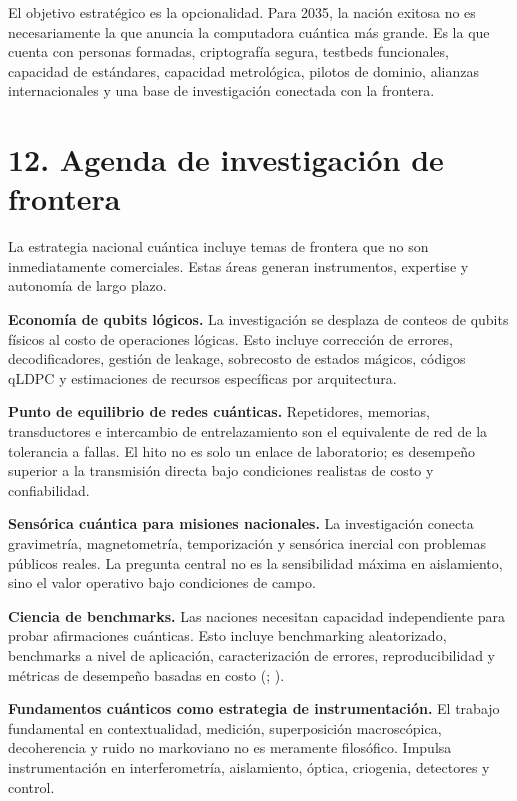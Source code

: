 \documentclass[
  11pt,
  letterpaper,
]{article}
\begin{document}
El objetivo estratégico es la opcionalidad. Para 2035, la nación exitosa
no es necesariamente la que anuncia la computadora cuántica más grande.
Es la que cuenta con personas formadas, criptografía segura, testbeds
funcionales, capacidad de estándares, capacidad metrológica, pilotos de
dominio, alianzas internacionales y una base de investigación conectada
con la frontera.

\section{12. Agenda de investigación de
frontera}\label{agenda-de-investigaciuxf3n-de-frontera}

La estrategia nacional cuántica incluye temas de frontera que no son
inmediatamente comerciales. Estas áreas generan instrumentos, expertise
y autonomía de largo plazo.

\textbf{Economía de qubits lógicos.} La investigación se desplaza de
conteos de qubits físicos al costo de operaciones lógicas. Esto incluye
corrección de errores, decodificadores, gestión de leakage, sobrecosto
de estados mágicos, códigos qLDPC y estimaciones de recursos específicas
por arquitectura.

\textbf{Punto de equilibrio de redes cuánticas.} Repetidores, memorias,
transductores e intercambio de entrelazamiento son el equivalente de red
de la tolerancia a fallas. El hito no es solo un enlace de laboratorio;
es desempeño superior a la transmisión directa bajo condiciones
realistas de costo y confiabilidad.

\textbf{Sensórica cuántica para misiones nacionales.} La investigación
conecta gravimetría, magnetometría, temporización y sensórica inercial
con problemas públicos reales. La pregunta central no es la sensibilidad
máxima en aislamiento, sino el valor operativo bajo condiciones de
campo.

\textbf{Ciencia de benchmarks.} Las naciones necesitan capacidad
independiente para probar afirmaciones cuánticas. Esto incluye
benchmarking aleatorizado, benchmarks a nivel de aplicación,
caracterización de errores, reproducibilidad y métricas de desempeño
basadas en costo (;
).

\textbf{Fundamentos cuánticos como estrategia de instrumentación.} El
trabajo fundamental en contextualidad, medición, superposición
macroscópica, decoherencia y ruido no markoviano no es meramente
filosófico. Impulsa instrumentación en interferometría, aislamiento,
óptica, criogenia, detectores y control.
\end{document}
